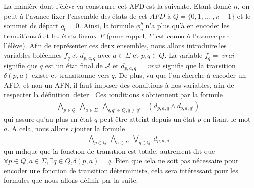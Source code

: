 \documentclass[12pt,a4paper,oneside,titlepage]{report}
\begin{document}
\noindent La manière dont l'élève va construire cet AFD est la suivante. Etant donné $n$, on peut à l'avance fixer l'ensemble des états de cet $AFD$  à $Q=\{0,1,...$ $,n-1\}$ et le sommet de départ $q_0=0$. Ainsi, la formule $\phi^S_n$ n'a plus qu'à en encoder les transitions $\delta$ et les états finaux $F$ (pour rappel, $\Sigma$ est connu à l'avance par l'élève). Afin de représenter ces deux ensembles, nous allons introduire les variables boléennes $f_q$ et $d_{p,a,q}$ avec $a\in\Sigma$ et $p,q\in Q$. La variable $f_q=$ $vrai$ signifie que $q$ est un état final de $\mathcal{A}$ et $d_{p,a,q}=$ $vrai$ signifie que la transition $\delta(p,a)$ existe et transitionne vers $q$. De plus, vu que l'on cherche à encoder un AFD, et non un AFN, il faut imposer des conditions à nos variables, afin de respecter la définition \ref{deter}. Ces conditions s'obtiennent par la formule
\begin{equation}
\label{booldeter1}
\begin{aligned} \bigwedge _{p \in Q}~ \bigwedge _{a \in \varSigma }~ \bigwedge _{q, q' \in Q, q \ne q'}~ \neg (d_{p, a, q} \land d_{p, a, q'}) \end{aligned}
\end{equation}
qui assure qu'au plus un état $q$ peut être atteint depuis un état $p$ en lisant le mot $a$. A cela, nous allons ajouter la formule 
\begin{equation}
\label{booldeter2}
\begin{aligned} \bigwedge _{p \in Q}~ \bigwedge _{a \in \varSigma }~ \bigvee _{q \in Q}~ d_{p, a, q} \end{aligned}
\end{equation}
qui indique que la fonction de transition est totale, autrement dit que $\forall p\in Q, a\in\Sigma, \exists q\in Q, \delta(p,a)=q$. Bien que cela ne soit pas nécessaire pour encoder une fonction de transition déterministe, cela sera intéressant pour les formules que nous allons définir par la suite.
\end{document}
